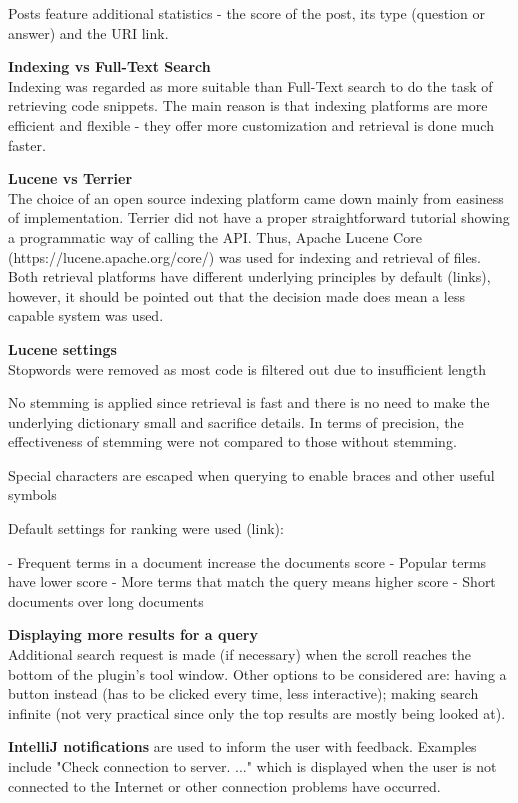 \documentclass{l4proj}
\begin{document}
Posts feature additional statistics - the score of the post, its type (question or answer) and the URI link.

\textbf{Indexing vs Full-Text Search}\\
Indexing was regarded as more suitable than Full-Text search to do the task of retrieving code snippets. The main reason is that indexing platforms are more efficient and flexible - they offer more customization and retrieval is done much faster.

\textbf{Lucene vs Terrier}\\
The choice of an open source indexing platform came down mainly from easiness of implementation. Terrier did not have a proper straightforward tutorial showing a programmatic way of calling the API. Thus, Apache Lucene Core (https://lucene.apache.org/core/) was used for indexing and retrieval of files. Both retrieval platforms have different underlying principles by default (links), however, it should be pointed out that the decision made does mean a less capable system was used.

\textbf{Lucene settings}\\
Stopwords were removed as most code is filtered out due to insufficient length

No stemming is applied since retrieval is fast and there is no need to make the underlying dictionary small and sacrifice details. In terms of precision, the effectiveness of stemming were not compared to those without stemming. 

Special characters are escaped when querying to enable braces and other useful symbols 

Default settings for ranking were used (link):

- Frequent terms in a document increase the documents score
- Popular terms have lower score
- More terms that match the query means higher score
- Short documents over long documents


\textbf{Displaying more results for a query}\\
Additional search request is made (if necessary) when the scroll reaches the bottom of the plugin's tool window. Other options to be considered are: having a button instead (has to be clicked every time, less interactive); making search infinite (not very practical since only the top results are mostly being looked at).

\textbf{IntelliJ notifications} are used to inform the user with feedback. Examples include "Check connection to server. ..." which is displayed when the user is not connected to the Internet or other connection problems have occurred.
\end{document}
